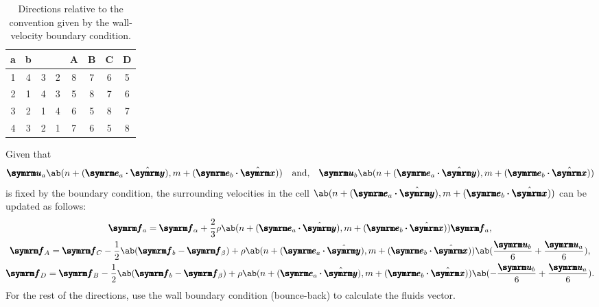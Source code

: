 \begin{table}[ht]
	\centering
	\begin{tabular}{C C | C C C C C C}
		a & b & \alpha & \beta & A & B & C & D \\
		 & 4 & 3      & 2     & 8 & 7 & 6 & 5 \\
		2 & 1 & 4      & 3     & 5 & 8 & 7 & 6 \\
		3 & 2 & 1      & 4     & 6 & 5 & 8 & 7 \\
		4 & 3 & 2      & 1     & 7 & 6 & 5 & 8
	\end{tabular}
	\caption{Directions relative to the convention given by the wall-velocity boundary condition.}
	\label{tab:relative-direction}
\end{table}

Given that
\begin{equation}
	\vv{u}_a\ab(n + (\vv{e}_a\vdot\yhat), m + (\vv{e}_b\vdot\xhat)) \mathand \vv{u}_b\ab(n + (\vv{e}_a\vdot\yhat), m + (\vv{e}_b\vdot\xhat))
\end{equation}
is fixed by the boundary condition, the surrounding velocities in the cell $\ab(n + (\vv{e}_a\vdot\yhat), m + (\vv{e}_b\vdot\xhat))$ can be updated as follows: \cite{zou-1997}
\begin{gather}
	\vv{f}_a = \vv{f}_{\alpha} + \frac{2}{3}\rho\ab(n + (\vv{e}_a\vdot\yhat), m + (\vv{e}_b\vdot\xhat))\vv{f}_a, \label{eq:velocity-boundary-1} \\
	\vv{f}_A = \vv{f}_{C} - \frac{1}{2}\ab(\vv{f}_b - \vv{f}_{\beta}) + \rho\ab(n + (\vv{e}_a\vdot\yhat), m + (\vv{e}_b\vdot\xhat))\ab(\frac{\vv{u}_b}{6} + \frac{\vv{u}_a}{6}), \label{eq:velocity-boundary-2}\\
	\vv{f}_D = \vv{f}_{B} - \frac{1}{2}\ab(\vv{f}_b - \vv{f}_{\beta}) + \rho\ab(n + (\vv{e}_a\vdot\yhat), m + (\vv{e}_b\vdot\xhat))\ab(- \frac{\vv{u}_b}{6} + \frac{\vv{u}_a}{6}). \label{eq:velocity-boundary-3}
\end{gather}
For the rest of the directions, use the wall boundary condition (bounce-back) to calculate the fluids vector.
